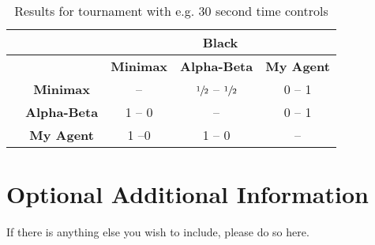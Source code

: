 \documentclass[twocolumn]{article}
\begin{document}
\begin{table}[h!]
\centering
\begin{tabular}{|c|c|c|c|c|}
\hline
                       &                     & \multicolumn{3}{c|}{Black}                                           \\ \hline
                       &                     & \textbf{Minimax} & \textbf{Alpha-Beta}           & \textbf{My Agent} \\ \hline
\parbox[t]{2mm}{} & \textbf{Minimax}    & --                & $\sfrac{1}{2}$ -- $\sfrac{1}{2}$ & 0 -- 1               \\ 
                       & \textbf{Alpha-Beta} & 1 -- 0              & --                             & 0 -- 1               \\ 
                       & \textbf{My Agent}   & 1 --0              & 1 -- 0                           & --                 \\ \hline
\end{tabular}
\caption{Results for tournament with e.g. 30 second time controls}
\end{table}


\section{Optional Additional Information}

If there is anything else you wish to include, please do so here.
\end{document}
